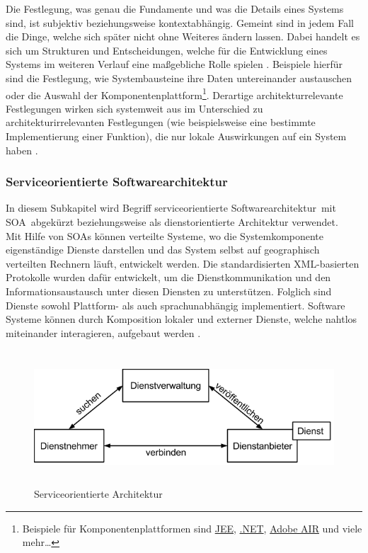 Die Festlegung, was genau die Fundamente und was die Details eines Systems sind, ist subjektiv beziehungsweise kontextabhängig. Gemeint sind in jedem Fall die Dinge, welche sich später nicht ohne Weiteres ändern lassen. Dabei handelt es sich um Strukturen und Entscheidungen, welche für die Entwicklung eines Systems im weiteren Verlauf eine maßgebliche Rolle spielen \citereset \autocite{Fowler.2005}. Beispiele hierfür sind die Festlegung, wie Systembausteine ihre Daten untereinander austauschen oder die Auswahl der Komponentenplattform\footnote{Beispiele für Komponentenplattformen sind \href{http://www.oracle.com/technetwork/java/javaee}{JEE}, \href{http://www.microsoft.com/net}{.NET}, \href{http://www.adobe.com/at/products/air.html}{Adobe AIR} und viele mehr\ldots }. Derartige architekturrelevante Festlegungen wirken sich systemweit aus im Unterschied zu architekturirrelevanten Festlegungen (wie beispielsweise eine bestimmte Implementierung einer Funktion), die nur lokale Auswirkungen auf ein System haben \citereset \autocite{Bredemeyer.Malan.2004}.

\subsubsection{Serviceorientierte Softwarearchitektur}
\label{sec:2_Serviceorientierte_Softwarearchitektur}
In diesem Subkapitel wird Begriff \glqq serviceorientierte Softwarearchitektur\grqq\ mit \glqq SOA\grqq\ abgekürzt beziehungsweise als dienstorientierte Architektur verwendet.\\

Mit Hilfe von SOAs können verteilte Systeme, wo die Systemkomponente eigenständige Dienste darstellen und das System selbst auf geographisch verteilten Rechnern läuft, entwickelt werden. Die standardisierten XML-basierten Protokolle wurden dafür entwickelt, um die Dienstkommunikation und den Informationsaustausch unter diesen Diensten zu unterstützen. Folglich sind Dienste sowohl Plattform- als auch sprachunabhängig implementiert. Software Systeme können durch Komposition lokaler und externer Dienste, welche nahtlos miteinander interagieren, aufgebaut werden \citereset \autocite{Sommerville.2011}.

\begin{figure}[h]
\centering
\includegraphics[height=5.0cm]{images/soa.png}
\caption[
Serviceorientierte Architektur
]{Serviceorientierte Architektur}
\label{fig:2_SOA}
\end{figure}

